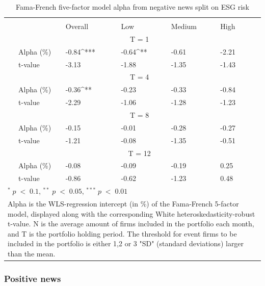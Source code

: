 \setlength{\tabcolsep}{15pt}
\begin{table}[H]
\small
\centering
\caption{Fama-French five-factor model alpha from negative news split on ESG risk} 
\begin{tabular}{llllllc}
\hline \hline \\ 
 &     & Overall &    Low  &  Medium  &  High &  \\    \cline{3-6} 
& &  \multicolumn{3}{c}{ T = 1} & \\ \cline{2-6}
& Alpha (\%)    & -0.84^{***} & -0.64^{**}  & -0.61  & -2.21 &  \\ 
& t-value   & -3.13 & -1.88 & -1.35  & -1.43 &  \\
& &  \multicolumn{3}{c}{ T = 4} & \\ \cline{2-6}
& Alpha (\%)   & -0.36^{**} & -0.23  & -0.33  &  -0.84 & \\
& t-value &   -2.29 & -1.06 & -1.28  & -1.23 & \\
& &  \multicolumn{3}{c}{ T = 8} & \\ \cline{2-6}
& Alpha (\%)    & -0.15 & -0.01   & -0.28  & -0.27 &  \\
& t-value &   -1.21 & -0.08  & -1.35 & -0.51 &  \\
& &  \multicolumn{3}{c}{ T = 12} & \\ \cline{2-6}
& Alpha (\%)    & -0.08 & -0.09  & -0.19  & 0.25 &  \\
& t-value &    -0.86 & -0.62  & -1.23 & 0.48 &  \\
\hline \hline
 \multicolumn{7}{l}{ \footnotesize $^* \; p\; <\; 0.1$, $ ^{**} \; p\; <\; 0.05$, $ ^{***} \; p\; <\; 0.01$  } \\
 \multicolumn{7}{p{12cm}}{ \footnotesize Alpha is the WLS-regression intercept (in \%) of the Fama-French 5-factor model, displayed along with the corresponding White heteroskedasticity-robust t-value. N is the average amount of firms included in the portfolio each month, and T is the portfolio holding period. The threshold for event firms to be included in the portfolio is either 1,2 or 3 "SD" (standard deviations) larger than the mean.} \\ 
 \hline
\end{tabular}
\label{tab: FF5_neg_ESG}
\end{table}




\subsubsection{Positive news}

